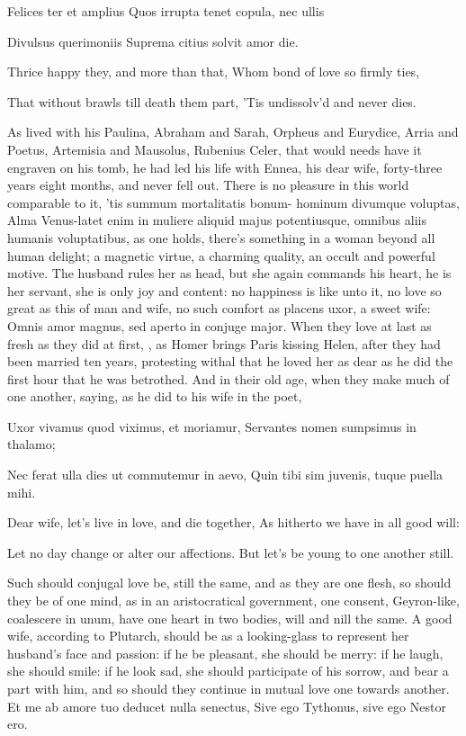 Felices ter et amplius
Quos irrupta tenet copula, nec ullis

Divulsus querimoniis
Suprema citius solvit amor die.


Thrice happy they, and more than that,
Whom bond of love so firmly ties,

That without brawls till death them part,
'Tis undissolv'd and never dies.

As \Seneca{} lived with his Paulina, Abraham and Sarah, Orpheus and
Eurydice, Arria and Poetus, Artemisia and Mausolus, Rubenius Celer,
that would needs have it engraven on his tomb, he had led his life with
Ennea, his dear wife, forty-three years eight months, and never fell
out. There is no pleasure in this world comparable to it, 'tis summum
mortalitatis bonum- hominum divumque voluptas, Alma Venus-latet
enim in muliere aliquid majus potentiusque, omnibus aliis humanis
voluptatibus, as one holds, there's something in a woman beyond
all human delight; a magnetic virtue, a charming quality, an occult and
powerful motive. The husband rules her as head, but she again commands
his heart, he is her servant, she is only joy and content: no happiness
is like unto it, no love so great as this of man and wife, no such
comfort as placens uxor, a sweet wife: Omnis amor magnus,
sed aperto in conjuge major. When they love at last as fresh as they
did at first, , as Homer brings
Paris kissing Helen, after they had been married ten years, protesting
withal that he loved her as dear as he did the first hour that he was
betrothed. And in their old age, when they make much of one another,
saying, as he did to his wife in the poet,

Uxor vivamus quod viximus, et moriamur,
Servantes nomen sumpsimus in thalamo;

Nec ferat ulla dies ut commutemur in aevo,
Quin tibi sim juvenis, tuque puella mihi.


Dear wife, let's live in love, and die together,
As hitherto we have in all good will:

Let no day change or alter our affections.
But let's be young to one another still.

Such should conjugal love be, still the same, and as they are one
flesh, so should they be of one mind, as in an aristocratical
government, one consent, Geyron-like, coalescere in unum, have
one heart in two bodies, will and nill the same. A good wife, according
to Plutarch, should be as a looking-glass to represent her husband's
face and passion: if he be pleasant, she should be merry: if he laugh,
she should smile: if he look sad, she should participate of his sorrow,
and bear a part with him, and so should they continue in mutual love
one towards another.
Et me ab amore tuo deducet nulla senectus,
Sive ego Tythonus, sive ego Nestor ero.

